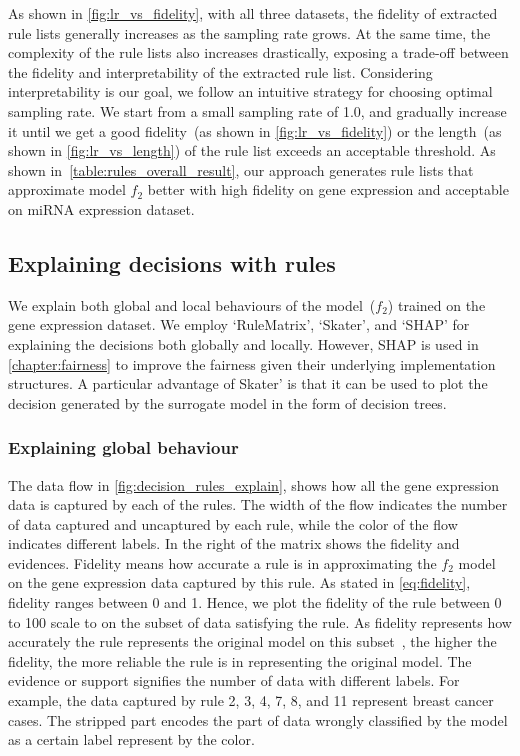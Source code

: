 \hspace*{3.5mm} As shown in \cref{fig:lr_vs_fidelity}, with all three datasets, the fidelity of extracted rule lists generally increases as the sampling rate grows. At the same time, the complexity of the rule lists also increases drastically, exposing a trade-off between the fidelity and interpretability of the extracted rule list. Considering interpretability is our goal, we follow an intuitive strategy for choosing optimal sampling rate. We  start from a small sampling rate of 1.0, and gradually increase it until we get a good fidelity~(as shown in \cref{fig:lr_vs_fidelity}) or the length~(as shown in \cref{fig:lr_vs_length}) of the rule list exceeds an acceptable threshold. As shown in~\cref{table:rules_overall_result}, our approach generates rule lists that approximate model $f_2$ better with high fidelity on gene expression and acceptable on miRNA expression dataset. 

\subsection{Explaining decisions with rules}
We explain both global and local behaviours of the model~($f_2$) trained on the gene expression dataset. We employ `RuleMatrix', `Skater', and `SHAP' for explaining the decisions both globally and locally. However, SHAP is used in \cref{chapter:fairness} to improve the fairness given their underlying implementation structures. A particular advantage of Skater' is that it can be used to plot the decision generated by the surrogate model in the form of decision trees. 

\subsubsection{Explaining global behaviour}
The data flow in \cref{fig:decision_rules_explain}, shows how all the gene expression data is captured by each of the rules. The width of the flow indicates the number of data captured and uncaptured by each rule, while the color of the flow indicates different labels. In the right of the matrix shows the fidelity and evidences. Fidelity means how accurate a rule is in approximating the $f_2$ model on the gene expression data captured by this rule. 
As stated in \cref{eq:fidelity}, fidelity ranges between 0 and 1. Hence, we plot the fidelity of the rule between 0 to 100 scale to on the subset of data satisfying the rule. As fidelity represents how accurately the rule represents the original model on this subset~\cite{ming2018rulematrix}, the higher the fidelity, the more reliable the rule is in representing the original model. The evidence or support signifies the number of data with different labels. For example, the data captured by rule 2, 3, 4, 7, 8, and 11 represent breast cancer cases. The stripped part encodes the part of data wrongly classified by the model as a certain label represent by the color.

